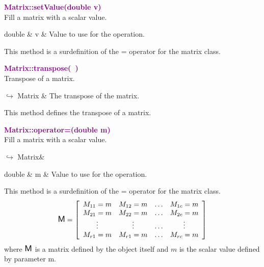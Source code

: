 \textcolor{purple}{\textbf{Matrix::setValue(double v)}}\label{Matrix::setValue(double v)}\\
Fill a matrix with a scalar value.

\begin{tcolorbox}[width=\textwidth,myArgs,tabularx={ll|R}]
double & v & Value to use for the operation.
\end{tcolorbox}

This method is a surdefinition of the = operator for the matrix class.

\textcolor{purple}{\textbf{Matrix::transpose(~)}}\label{Matrix::transpose()}\\
Transpose of a matrix.\vspace*{-0.5em}
\begin{tcolorbox}[grow to left by=-1cm, width=\textwidth-1cm,myArgs,tabularx={l|R}]
$\hookrightarrow$ Matrix & The transpose of the matrix.
\end{tcolorbox}

This method defines the transpose of a matrix.

\textcolor{purple}{\textbf{Matrix::operator=(double m)}}\label{Matrix::operator=(double m)}\\
Fill a matrix with a scalar value.\vspace*{-0.5em}
\begin{tcolorbox}[grow to left by=-1cm, width=\textwidth-1cm,myArgs,tabularx={l|R}]
$\hookrightarrow$ Matrix&
\end{tcolorbox}

\begin{tcolorbox}[width=\textwidth,myArgs,tabularx={ll|R}]
double & m & Value to use for the operation.
\end{tcolorbox}

This method is a surdefinition of the = operator for the matrix class.
\begin{equation*}
\mbox{\large\ensuremath{\mathsf{M}}}=\left[\begin{array}{cccc}
  M_{11}=m & M_{12}=m & \hdots & M_{1c}=m\\
  M_{21}=m & M_{22}=m & \hdots & M_{2c}=m\\
  \vdots & \vdots & \hdots & \vdots\\
  M_{r1}=m & M_{r1}=m & \hdots & M_{rc}=m
  \end{array}\right]
\end{equation*}
where $\mbox{\large\ensuremath{\mathsf{M}}}$ is a matrix defined by the object itself and $m$ is the scalar value defined by parameter m.

